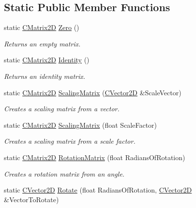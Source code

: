 \subsection*{Static Public Member Functions}
\begin{DoxyCompactItemize}
\item 
static \hyperlink{struct_c_matrix2_d}{C\+Matrix2D} \hyperlink{struct_c_matrix2_d_a2892b38c4ca0677846e6dd2aad3e9933}{Zero} ()
\begin{DoxyCompactList}\small\item\em Returns an empty matrix. \end{DoxyCompactList}\item 
static \hyperlink{struct_c_matrix2_d}{C\+Matrix2D} \hyperlink{struct_c_matrix2_d_a09f735cdd645ceff639fca65002b8cee}{Identity} ()
\begin{DoxyCompactList}\small\item\em Returns an identity matrix. \end{DoxyCompactList}\item 
static \hyperlink{struct_c_matrix2_d}{C\+Matrix2D} \hyperlink{struct_c_matrix2_d_ab1027aeee1183723c7962f90e4f25478}{Scaling\+Matrix} (\hyperlink{struct_c_vector2_d}{C\+Vector2D} \&Scale\+Vector)
\begin{DoxyCompactList}\small\item\em Creates a scaling matrix from a vector. \end{DoxyCompactList}\item 
static \hyperlink{struct_c_matrix2_d}{C\+Matrix2D} \hyperlink{struct_c_matrix2_d_aa05689545b315e57446c47c4e3ff0cec}{Scaling\+Matrix} (float Scale\+Factor)
\begin{DoxyCompactList}\small\item\em Creates a scaling matrix from a scale factor. \end{DoxyCompactList}\item 
static \hyperlink{struct_c_matrix2_d}{C\+Matrix2D} \hyperlink{struct_c_matrix2_d_ac426bd307bf097833d8411fb313134e7}{Rotation\+Matrix} (float Radians\+Of\+Rotation)
\begin{DoxyCompactList}\small\item\em Creates a rotation matrix from an angle. \end{DoxyCompactList}\item 
static \hyperlink{struct_c_vector2_d}{C\+Vector2D} \hyperlink{struct_c_matrix2_d_a89051c85ef7a467476827e948491a7d6}{Rotate} (float Radians\+Of\+Rotation, \hyperlink{struct_c_vector2_d}{C\+Vector2D} \&Vector\+To\+Rotate)

\end{DoxyCompactItemize}
